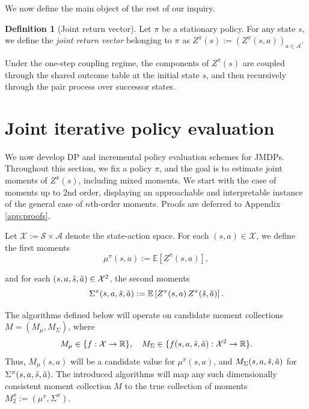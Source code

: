 \documentclass[accepted]{uai2026}
\theoremstyle{plain}
\theoremstyle{definition}
\newtheorem{definition}[theorem]{Definition}
\theoremstyle{remark}
\newcommand{\A}{\mathcal{A}}
\newcommand{\X}{\mathcal{X}}
\newcommand{\R}{\mathbb{R}}
\newcommand{\E}{\mathbb{E}}
\newcommand{\Ss}{\mathcal{S}}
\newcommand{\1}{\mathbbm{1}}
\begin{document}
We now define the main object of the rest of our inquiry.
\begin{definition}[Joint return vector]
Let $\pi$ be a stationary policy. For any state $s$, we define the \textit{joint return vector} belonging to $\pi$ as $Z^\pi(s) := ( Z^\pi(s, a))_{a \in \A}$.
\end{definition}
Under the one-step coupling regime, the components of $Z^\pi(s)$ are coupled through the shared outcome table at the initial state $s$, and then recursively through the pair process over successor states.

\section{Joint iterative policy evaluation}

We now develop DP and incremental policy evaluation schemes for JMDPs. Throughout this section, we fix a policy $\pi$, and the goal is to estimate joint moments of $Z^\pi(s)$, including mixed moments.  We start with the case of moments up to $2$nd order, displaying an approachable and interpretable instance of the general case of $n$th-order moments. Proofs are deferred to Appendix \ref{app:proofs}.

Let $\X:=\Ss \times \A$ denote the state-action space. For each $(s, a) \in \X$, we define the first moments
\begin{equation}
\mu^\pi(s, a) := \E\left[Z^\pi(s, a)\right],
\end{equation}

and for each $(s, a, \Tilde{s}, \Tilde{a}) \in \X^2$, the second moments
\begin{equation}
\Sigma^\pi(s, a, \Tilde{s}, \Tilde{a}) := \E\left[Z^\pi(s, a)\,Z^\pi(\Tilde{s}, \Tilde{a})\right].
\end{equation}

The algorithms defined below will operate on candidate moment collections $M = (M_\mu, M_\Sigma)$, where
\begin{equation}
\begin{gathered}
M_\mu\in \{f:\X \to \R\}, \quad
M_\Sigma \in \{f(s, a, \Tilde{s},\Tilde{a}): \X^2 \to \R\}.
\end{gathered}
\end{equation}
Thus, $M_\mu(s, a)$ will be a candidate value for $\mu^\pi(s,a)$, and $M_\Sigma(s, a, \Tilde{s}, \Tilde{a})$ for $\Sigma^\pi(s, a, \Tilde{s}, \Tilde{a})$. The introduced algorithms will map any such dimensionally consistent moment collection $M$ to the true collection of moments $M^\pi_2:=(\mu^\pi, \Sigma^\pi)$.
\end{document}
